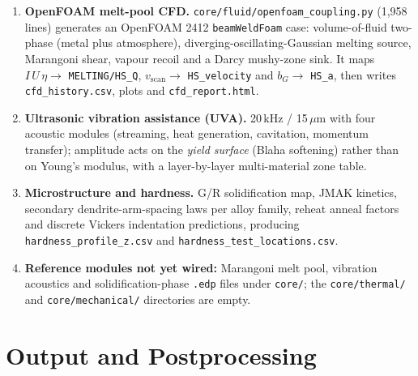 \documentclass[10pt,a4paper]{article}
\newcommand{\code}[1]{\texttt{#1}}
\newcommand{\file}[1]{\texttt{\small #1}}
\begin{document}
\begin{enumerate}[leftmargin=1.8em,itemsep=0.35em]
    \item \textbf{OpenFOAM melt-pool CFD.} \file{core/fluid/openfoam\_coupling.py}
    (1{,}958 lines) generates an OpenFOAM 2412 \code{beamWeldFoam} case:
    volume-of-fluid two-phase (metal plus atmosphere),
    diverging-oscillating-Gaussian melting source, Marangoni shear, vapour
    recoil and a Darcy mushy-zone sink. It maps
    $I\,U\,\eta \rightarrow$ \code{MELTING/HS\_Q},
    $v_{\text{scan}} \rightarrow$ \code{HS\_velocity} and
    $b_G \rightarrow$ \code{HS\_a}, then writes \code{cfd\_history.csv},
    plots and \code{cfd\_report.html}.
    \item \textbf{Ultrasonic vibration assistance (UVA).} 20\,kHz /
    15\,$\mu$m with four acoustic modules (streaming, heat generation,
    cavitation, momentum transfer); amplitude acts on the \emph{yield surface}
    (Blaha softening) rather than on Young's modulus, with a layer-by-layer
    multi-material zone table.
    \item \textbf{Microstructure and hardness.} G/R solidification map, JMAK
    kinetics, secondary dendrite-arm-spacing laws per alloy family, reheat
    anneal factors and discrete Vickers indentation predictions, producing
    \code{hardness\_profile\_z.csv} and \code{hardness\_test\_locations.csv}.
    \item \textbf{Reference modules not yet wired:} Marangoni melt pool,
    vibration acoustics and solidification-phase \code{.edp} files under
    \code{core/}; the \code{core/thermal/} and \code{core/mechanical/}
    directories are empty.
\end{enumerate}

\section{Output and Postprocessing}
\end{document}
